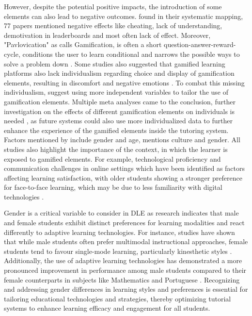 However, despite the potential positive impacts, the introduction of some elements can also lead to negative outcomes.
\textcite{almeidaSystematicMappingNegative2021} found in their systematic mapping, 77 papers mentioned negative effects like cheating, lack of understanding, demotivation in leaderboards and most often lack of effect.
Moreover, "Pavlovication" as \textcite{klabbersArchitectureGameScience2018} calls Gamification, is often a short question-answer-reward-cycle, conditions the user to learn conditional and narrows the possible ways to solve a problem down \parencite{klabbersArchitectureGameScience2018}.
Some studies also suggested that gamified learning platforms also lack individualism regarding choice and display of gamification elements, resulting in discomfort and negative emotions \parencite{santosDoesGenderStereotype2023}.
To combat this missing individualism, \textcite{oliveiraTailoredGamificationEducation2023,dehghanzadehUsingGamificationSupport2024} suggest using more independent variables to tailor the use of gamification elements.
Multiple meta analyses came to the conclusion, further investigation on the effects of different gamification elements on individuals is needed \textcite{oliveiraTailoredGamificationEducation2023,dehghanzadehUsingGamificationSupport2024,hamariDoesGamificationWork2014}, as future systems could also use more individualized data to further enhance the experience of the gamified elements inside the tutoring system.
Factors mentioned by \textcite{dehghanzadehUsingGamificationSupport2024} include gender and age, \textcite{oliveiraTailoredGamificationEducation2023} mentions culture and gender. All studies also highlight the importance of the context, in which the learner is exposed to gamified elements.
For example, technological proficiency and communication challenges in online settings which have been identified as factors affecting learning satisfaction, with older students showing a stronger preference for face-to-face learning, which may be due to less familiarity with digital technologies \parencite{dabajRoleGenderAge2009}.


Gender is a critical variable to consider in DLE as research indicates that male and female students exhibit distinct preferences for learning modalities and react differently to adaptive learning technologies.
For instance, studies have shown that while male students often prefer multimodal instructional approaches, female students tend to favour single-mode learning, particularly kinesthetic styles \parencite{wehrweinGenderDifferencesLearning2007}.
Additionally, the use of adaptive learning technologies has demonstrated a more pronounced improvement in performance among male students compared to their female counterparts in subjects like Mathematics and Portuguese \parencite{desantanaEvaluatingImpactMars2016}.
Recognizing and addressing gender differences in learning styles and preferences is essential for tailoring educational technologies and strategies, thereby optimizing tutorial systems to enhance learning efficacy and engagement for all students.

